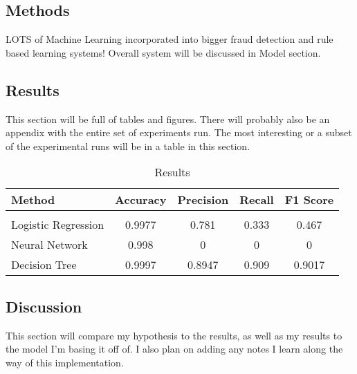 \documentclass[midd]{thesis}
\begin{document}
\pagebreak




\subsection{Methods}

LOTS of Machine Learning incorporated into bigger fraud detection and rule based learning systems! Overall system will be discussed in Model section.

\subsection{Results}

This section will be full of tables and figures. There will probably also be an appendix with the entire set of experiments run. The most interesting or a subset of the experimental runs will be in a table in this section.

\begin{table}[htbp]\centering
\def\sym#1{\ifmmode^{#1}\else\(^{#1}\)\fi}
\caption{Results \label{tab1}}
\label{sec:sumstats}
\scalebox{0.8} {
\begin{tabular}{l c c c c} \hline\hline
\addlinespace
Method&Accuracy& Precision&Recall& F1 Score\\
\hline
\addlinespace
\addlinespace
\multicolumn{5}{l}{\textit{Base Results}}\\
Logistic Regression	            &	0.9977	&	0.781	&	0.333	&	0.467	\\
Neural Network 	                &	0.998		&	0	&	0	&	0	\\
Decision Tree	            &	0.9997		&	0.8947	&	0.909	&	0.9017	\\

\hline\hline
\end{tabular}
}
\end{table} 


\subsection{Discussion}

This section will compare my hypothesis to the results, as well as my results to the model I'm basing it off of. I also plan on adding any notes I learn along the way of this implementation.
\pagebreak
\end{document}
